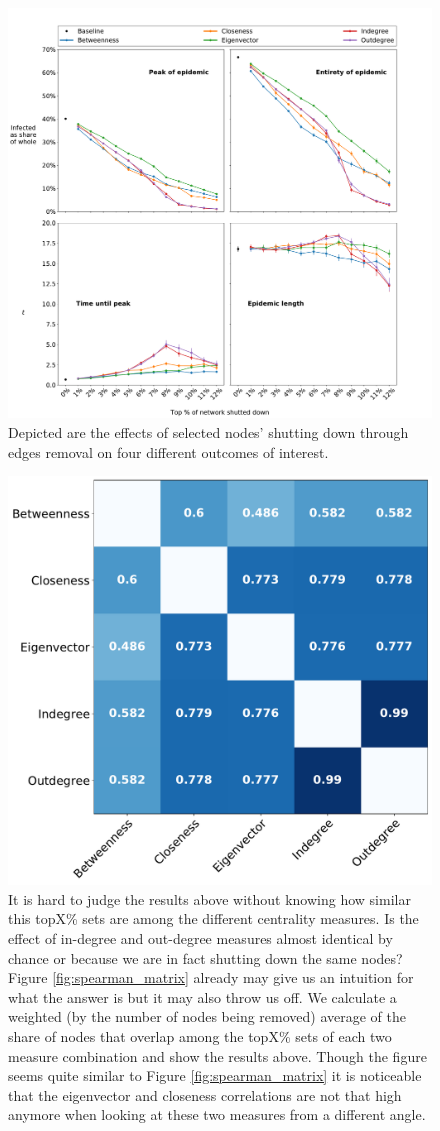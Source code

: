 \documentclass{Resources/netsci-project}
\begin{document}
\begin{figure}[!ht]
    \centering
    \includegraphics[width=\linewidth]{Figures/interest_outcomes.pdf}
    \caption{Depicted are the effects of selected nodes' shutting down through edges removal on four different outcomes of interest.}
    \label{fig:interest_outcomes}
\end{figure}

\begin{figure}[!ht]
    \centering
    \includegraphics[width=0.5\linewidth]{Figures/node_remove_overlap_matrix.pdf}
    \caption{It is hard to judge the results above without knowing how similar this topX\% sets are among the different centrality measures. Is the effect of in-degree and out-degree measures almost identical by chance or because we are in fact shutting down the same nodes? Figure \ref{fig:spearman_matrix} already may give us an intuition for what the answer is but it may also throw us off. We calculate a weighted (by the number of nodes being removed) average of the share of nodes that overlap among the topX\% sets of each two measure combination and show the results above. Though the figure seems quite similar to Figure \ref{fig:spearman_matrix} it is noticeable that the eigenvector and closeness correlations are not that high anymore when looking at these two measures from a different angle.}
    \label{fig:node_remove_overlap_matrix}
\end{figure}
\end{document}
